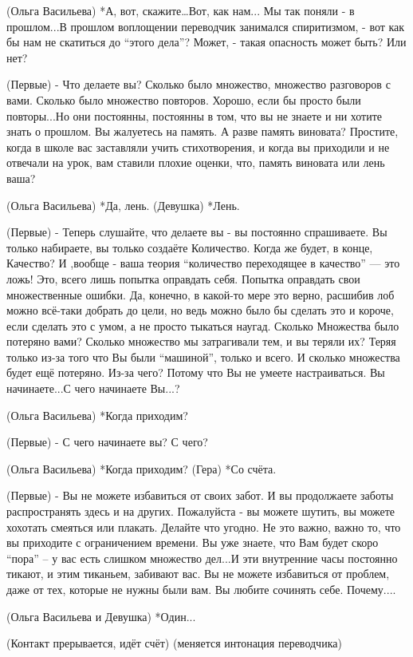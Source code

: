 (Ольга Васильева) *А, вот, скажите…Вот,  как нам... Мы так поняли - в прошлом...В прошлом воплощении переводчик занимался спиритизмом, - вот как бы нам не скатиться до “этого дела”? Может, - такая опасность может быть? Или нет?

(Первые) - Что делаете вы? Сколько было множество, множество разговоров с вами. Сколько было множество повторов. Хорошо, если бы просто были повторы...Но они постоянны, постоянны в том, что вы не знаете и ни хотите знать о прошлом. Вы жалуетесь на память. А разве память виновата? Простите, когда в школе вас заставляли учить стихотворения, и когда вы приходили и не отвечали на урок, вам ставили плохие оценки, что, память виновата или лень ваша?

(Ольга Васильева) *Да, лень.
(Девушка) *Лень.

(Первые) - Теперь слушайте, что делаете вы - вы постоянно спрашиваете. Вы только набираете, вы только создаёте Количество. Когда же будет, в конце, Качество? И ,вообще - ваша теория “количество переходящее в качество” — это ложь! Это, всего лишь попытка оправдать себя. Попытка оправдать свои множественные ошибки. Да, конечно, в какой-то мере это верно, расшибив лоб можно всё-таки добрать до цели, но ведь можно было бы сделать это и короче, если сделать это с умом, а не просто тыкаться наугад. Сколько Множества было потеряно вами? Сколько множество мы затрагивали тем, и вы теряли их? Теряя только из-за того что Вы были “машиной”, только и всего. И сколько множества будет ещё потеряно. Из-за чего? Потому что Вы не умеете настраиваться. Вы начинаете...С чего начинаете Вы...?

(Ольга Васильева) *Когда приходим?

(Первые) - С чего начинаете вы? С чего?

(Ольга Васильева) *Когда приходим?
(Гера) *Со счёта.

(Первые) - Вы не можете избавиться от своих забот. И вы продолжаете заботы распространять здесь и на других. Пожалуйста - вы можете шутить, вы можете хохотать смеяться или плакать. Делайте что угодно. Не это важно, важно то, что вы приходите с ограничением времени. Вы уже знаете, что Вам будет скоро “пора” –  у вас есть слишком множество дел...И эти внутренние часы постоянно тикают, и этим тиканьем, забивают вас. Вы не можете избавиться от проблем, даже от тех, которые не нужны были  вам. Вы любите сочинять себе. Почему....

(Ольга Васильева и Девушка) *Один...

(Контакт прерывается, идёт счёт)
(меняется интонация переводчика)

